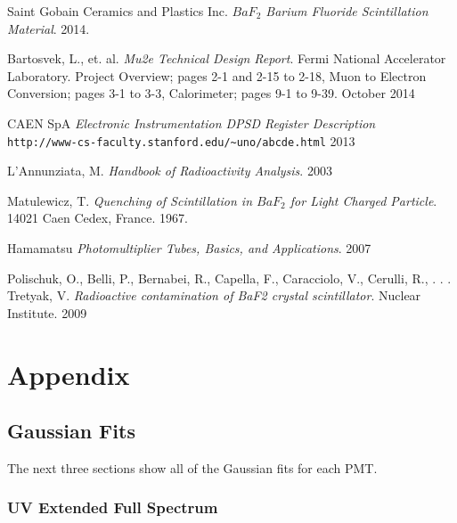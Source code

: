 \documentclass[aip, jmp, amssymb, amsmath, reprint, floatfix]{revtex4-1}
\begin{document}
\begin{thebibliography}{9}
Saint Gobain Ceramics and Plastics Inc. 
\textit{$BaF_2$ Barium Fluoride Scintillation Material}. 
2014.
 
Bartosvek, L., et. al.
\textit{Mu2e Technical Design Report}.
Fermi National Accelerator Laboratory. Project Overview; pages 2-1 and 2-15 to 2-18, Muon to Electron Conversion; pages 3-1 to 3-3, Calorimeter; pages 9-1 to 9-39. October 2014
 
CAEN SpA
\textit{Electronic Instrumentation DPSD Register Description}
\\\texttt{http://www-cs-faculty.stanford.edu/\~{}uno/abcde.html}
2013

L'Annunziata, M.
\textit{Handbook of Radioactivity Analysis}.
2003

Matulewicz, T.
\textit{Quenching of Scintillation in $BaF_2$ for Light Charged Particle}.
14021 Caen Cedex, France. 1967.

Hamamatsu
\textit{Photomultiplier Tubes, Basics, and Applications}.
2007

Polischuk, O., Belli, P., Bernabei, R., Capella, F., Caracciolo, V., Cerulli, R., . . . Tretyak, V.
\textit{Radioactive contamination of BaF2 crystal scintillator}.
Nuclear Institute. 2009

\end{thebibliography}

\section{\label{sec:level1}Appendix}

\subsection{\label{sec:level2}Gaussian Fits}

The next three sections show all of the Gaussian fits for each PMT. 

\subsubsection{\label{sec:level3}UV Extended Full Spectrum}
\end{document}
